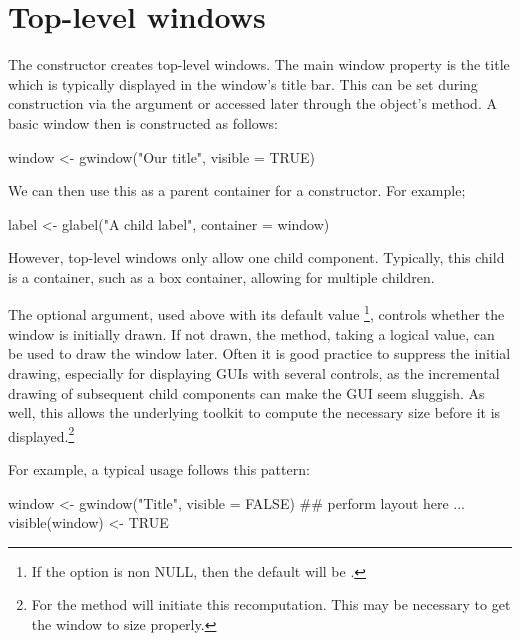 \section{Top-level windows}
\label{sec:gWidgets-top-level-windows}

The  constructor creates top-level windows. The
main window property is the title which is typically displayed in the
window's title bar. This can be set during construction via the
 argument or accessed later through the object's
 method. A basic window then is constructed as follows:

\begin{Schunk}
\begin{Sinput}
 window <- gwindow("Our title", visible = TRUE)
\end{Sinput}
\end{Schunk}
%

We can then use this as a parent container for a constructor. For example;
\begin{Schunk}
\begin{Sinput}
 label <- glabel("A child label", container = window)
\end{Sinput}
\end{Schunk}
%
However, top-level windows only allow one child component. Typically,
this child is a container, such as a box container, allowing for
multiple children.


The optional  argument, used above with its
default value \footnote{If the option
   is non NULL, then
  the default will be .}, controls whether the window is
initially drawn. If not drawn, the 
method, taking a logical value, can be used to draw the window later.
Often it is good practice to suppress the initial drawing, especially
for displaying GUIs with several controls, as the incremental drawing
of subsequent child components can make the GUI seem sluggish. As
well, this allows the underlying toolkit to compute the necessary size
before it is displayed.\footnote{For  the 
method will initiate this recomputation. This may be necessary to get the
window to size properly.}

For example, a typical usage follows this pattern:
\begin{Schunk}
\begin{Sinput}
 window <- gwindow("Title", visible = FALSE)
 ## perform layout here ...
 visible(window) <- TRUE
\end{Sinput}
\end{Schunk}

